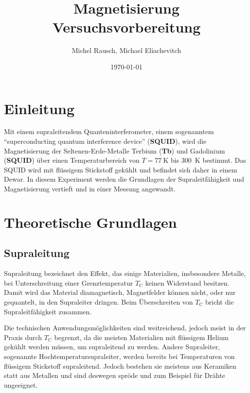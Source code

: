 \documentclass[a4paper,ngerman]{scrartcl}
\title{Magnetisierung\\Versuchsvorbereitung}
\date{\today}
\author{Michel Rausch, Michael Eliachevitch}
\begin{document}
\maketitle
\tableofcontents
\newpage

\section{Einleitung}


Mit einem supraleitendem Quanteninterferometer, einem sogenanntem
"`superconducting quantum interference device"' (\textbf{SQUID}), wird
die Magnetisierung der Seltenen-Erde-Metalle Terbium (\textbf{Tb}) und
Gadolinium (\textbf{SQUID}) über einen Temperaturbereich von $T=
\SI{77}{\kelvin}$ bis \SI{300}{\kelvin} bestimmt.
Das SQUID wird mit flüssigem Stickstoff gekühlt und befindet sich
daher in einem Dewar. In diesem Experiment werden die Grundlagen der
Supraleitfähigkeit und Magnetisierung vertieft und in einer Messung
angewandt.


\section{Theoretische Grundlagen}

\subsection{Supraleitung}

Supraleitung bezeichnet den Effekt, das einige Materialien, insbesondere Metalle, bei Unterschreitung einer Grenztemperatur $T_{\mathrm{C}}$ keinen Widerstand besitzen. 
Damit wird das Material diamagnetisch, Magnetfelder können nicht, oder nur gequantelt, in den Supraleiter dringen. 
Beim Überschreiten von $T_{\mathrm{C}}$ bricht die Supraleitfähigkeit zusammen. 

Die technischen Anwendungsmöglichkeiten sind weitreichend, jedoch meist in der Praxis durch $T_{\mathrm{C}}$ begrenzt, da die meisten Materialien mit flüssigem Helium gekühlt werden müssen, um supraleitend zu werden.
Andere Supraleiter, sogenannte Hochtemperatursupraleiter, werden bereits bei Temperaturen von flüssigem Stickstoff supraleitend. Jedoch bestehen sie meistens aus Keramiken statt aus Metallen und sind deswegen spröde und zum Beispiel für Drähte ungeeignet. 
\end{document}
